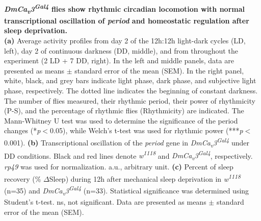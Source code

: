\label{fig:4}
\textbf{ \emph{DmCa\textsubscript{v}3\textsuperscript{Gal4}} flies show rhythmic circadian locomotion with normal transcriptional oscillation of \emph{period} and homeostatic regulation after sleep deprivation.}
\\
\textbf{(a)} Average activity profiles from day 2 of the 12h:12h light-dark cycles (LD, left), day 2 of continuous darkness (DD, middle), and from throughout the experiment (2 LD + 7 DD, right).
In the left and middle panels, data are presented as means $\pm$ standard error of the mean (SEM).
In the right panel, white, black, and grey bars indicate light phase, dark phase, and subjective light phase, respectively.
The dotted line indicates the beginning of constant darkness. 
The number of flies measured, their rhythmic period, their power of rhythmicity (P-S), and the percentage of rhythmic flies (Rhythmicity) are indicated.
The Mann-Whitney U test was used to determine the significance of the period changes (*\emph{p}$<$0.05), while Welch's t-test was used for rhythmic power (***\emph{p}$<$0.001). 
\textbf{(b)} Transcriptional oscillation of the \emph{period} gene in \emph{DmCa\textsubscript{v}3\textsuperscript{Gal4}} under DD conditions. Black and red lines denote \emph{w\textsuperscript{1118}} and \emph{DmCa\textsubscript{v}3\textsuperscript{Gal4}}, respectively.
\emph{rp49} was used for normalization.
a.u., arbitrary unit.
\textbf{(c)} Percent of sleep recovery (\% $\Delta$Sleep) during 12h after mechanical sleep deprivation in \emph{w\textsuperscript{1118}} (n=35) and \emph{DmCa\textsubscript{v}3\textsuperscript{Gal4}} (n=33). 
Statistical significance was determined using Student's t-test. 
ns, not significant.
Data are presented as means $\pm$ standard error of the mean (SEM).
